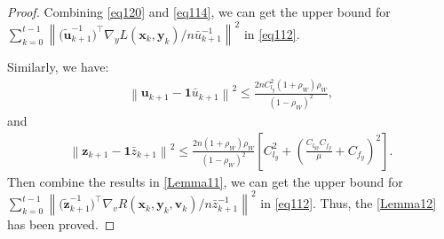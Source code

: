 \documentclass{article}
\theoremstyle{plain}
\theoremstyle{definition}
\theoremstyle{remark}
\begin{document}
\begin{proof}
Combining \cref{eq120} and \cref{eq114}, we can get the upper bound for $\sum_{k=0}^{t-1} \left\| {\big(\tilde{\mathbf{u}}_{k+1}^{-1}\big)^\top} {\nabla}_y L(\mathbf{x}_k, \mathbf{y}_k) /{n\bar{u}_{k+1}^{-1}}\right\|^2$ in \cref{eq112}. 

Similarly, we have:
\begin{align}
\left\| \mathbf{u}_{k+1}-\mathbf{1}\bar{u}_{k+1}\right\|^2\leq \frac{2nC_{l_y}^2 (1 + \rho_W) \rho_W}{(1 - \rho_W)^2},\label{eq11119}
\end{align}
and
\begin{align}
\left\| \mathbf{z}_{k+1}-\mathbf{1}\bar{z}_{k+1}\right\|^2\leq \frac{2n (1 + \rho_W) \rho_W}{(1 - \rho_W)^2}\left[C_{l_y}^2+\left(\frac{C_{l_{yy}}C_{f_y}}{\mu}+C_{f_y}\right)^2\right].\label{eq111191}
\end{align}
Then combine the results in \cref{Lemma11}, we can get the upper bound for $\sum_{k=0}^{t-1} \left\| {\big(\tilde{\mathbf{z}}_{k+1}^{-1}\big)^\top} \nabla_v R(\mathbf{x}_k, \mathbf{y}_k, \mathbf{v}_k) /{n\bar{z}_{k+1}^{-1}}\right\|^2$ in \cref{eq112}.
Thus, the \cref{Lemma12} has been proved.
\end{proof}
\end{document}
